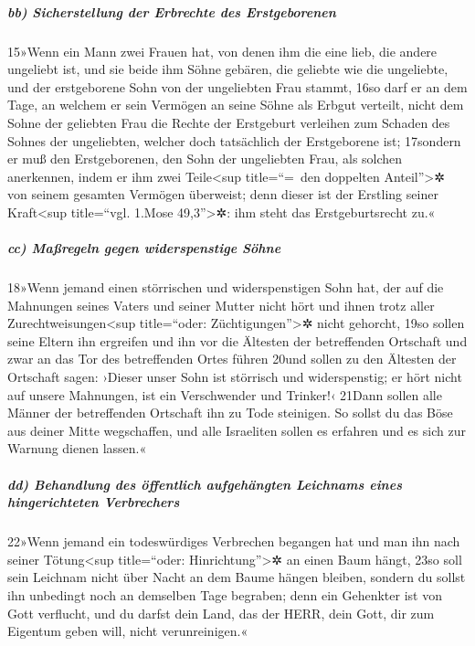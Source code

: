 \hypertarget{bb-sicherstellung-der-erbrechte-des-erstgeborenen}{%
\subparagraph{bb) Sicherstellung der Erbrechte des
Erstgeborenen}\label{bb-sicherstellung-der-erbrechte-des-erstgeborenen}}

15»Wenn ein Mann zwei Frauen hat, von denen ihm die eine lieb, die
andere ungeliebt ist, und sie beide ihm Söhne gebären, die geliebte wie
die ungeliebte, und der erstgeborene Sohn von der ungeliebten Frau
stammt, 16so darf er an dem Tage, an welchem er sein Vermögen an seine
Söhne als Erbgut verteilt, nicht dem Sohne der geliebten Frau die Rechte
der Erstgeburt verleihen zum Schaden des Sohnes der ungeliebten, welcher
doch tatsächlich der Erstgeborene ist; 17sondern er muß den
Erstgeborenen, den Sohn der ungeliebten Frau, als solchen anerkennen,
indem er ihm zwei Teile\textless sup title=``=~den doppelten
Anteil''\textgreater✲ von seinem gesamten Vermögen überweist; denn
dieser ist der Erstling seiner Kraft\textless sup title=``vgl. 1.Mose
49,3''\textgreater✲: ihm steht das Erstgeburtsrecht zu.«

\hypertarget{cc-mauxdfregeln-gegen-widerspenstige-suxf6hne}{%
\subparagraph{cc) Maßregeln gegen widerspenstige
Söhne}\label{cc-mauxdfregeln-gegen-widerspenstige-suxf6hne}}

18»Wenn jemand einen störrischen und widerspenstigen Sohn hat, der auf
die Mahnungen seines Vaters und seiner Mutter nicht hört und ihnen trotz
aller Zurechtweisungen\textless sup title=``oder:
Züchtigungen''\textgreater✲ nicht gehorcht, 19so sollen seine Eltern ihn
ergreifen und ihn vor die Ältesten der betreffenden Ortschaft und zwar
an das Tor des betreffenden Ortes führen 20und sollen zu den Ältesten
der Ortschaft sagen: ›Dieser unser Sohn ist störrisch und widerspenstig;
er hört nicht auf unsere Mahnungen, ist ein Verschwender und Trinker!‹
21Dann sollen alle Männer der betreffenden Ortschaft ihn zu Tode
steinigen. So sollst du das Böse aus deiner Mitte wegschaffen, und alle
Israeliten sollen es erfahren und es sich zur Warnung dienen lassen.«

\hypertarget{dd-behandlung-des-uxf6ffentlich-aufgehuxe4ngten-leichnams-eines-hingerichteten-verbrechers}{%
\subparagraph{dd) Behandlung des öffentlich aufgehängten Leichnams eines
hingerichteten
Verbrechers}\label{dd-behandlung-des-uxf6ffentlich-aufgehuxe4ngten-leichnams-eines-hingerichteten-verbrechers}}

22»Wenn jemand ein todeswürdiges Verbrechen begangen hat und man ihn
nach seiner Tötung\textless sup title=``oder: Hinrichtung''\textgreater✲
an einen Baum hängt, 23so soll sein Leichnam nicht über Nacht an dem
Baume hängen bleiben, sondern du sollst ihn unbedingt noch an demselben
Tage begraben; denn ein Gehenkter ist von Gott verflucht, und du darfst
dein Land, das der HERR, dein Gott, dir zum Eigentum geben will, nicht
verunreinigen.«


